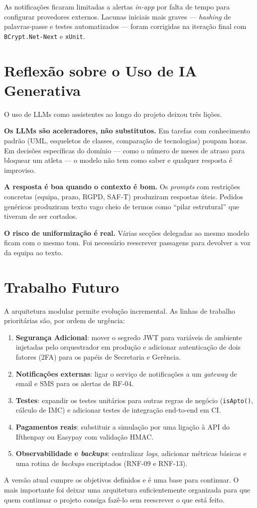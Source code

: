 As notificações ficaram limitadas a alertas \textit{in-app} por falta de tempo para configurar provedores externos. Lacunas iniciais mais graves --- \textit{hashing} de palavras-passe e testes automatizados --- foram corrigidas na iteração final com \texttt{BCrypt.Net-Next} e \texttt{xUnit}.

\section{Reflexão sobre o Uso de IA Generativa}

O uso de LLMs como assistentes ao longo do projeto deixou três lições.

\textbf{Os LLMs são aceleradores, não substitutos.} Em tarefas com conhecimento padrão (UML, esqueletos de classes, comparação de tecnologias) poupam horas. Em decisões específicas do domínio --- como o número de meses de atraso para bloquear um atleta --- o modelo não tem como saber e qualquer resposta é improviso.

\textbf{A resposta é boa quando o contexto é bom.} Os \textit{prompts} com restrições concretas (equipa, prazo, RGPD, SAF-T) produziram respostas úteis. Pedidos genéricos produziram texto vago cheio de termos como ``pilar estrutural'' que tiveram de ser cortados.

\textbf{O risco de uniformização é real.} Várias secções delegadas ao mesmo modelo ficam com o mesmo tom. Foi necessário reescrever passagens para devolver a voz da equipa ao texto.

\section{Trabalho Futuro}

A arquitetura modular permite evolução incremental. As linhas de trabalho prioritárias são, por ordem de urgência:

\begin{enumerate}
    \item \textbf{Segurança Adicional}: mover o segredo JWT para variáveis de ambiente injetadas pelo orquestrador em produção e adicionar autenticação de dois fatores (2FA) para os papéis de Secretaria e Gerência.
    \item \textbf{Notificações externas}: ligar o serviço de notificações a um \textit{gateway} de email e SMS para os alertas de RF-04.
    \item \textbf{Testes}: expandir os testes unitários para outras regras de negócio (\texttt{isApto()}, cálculo de IMC) e adicionar testes de integração end-to-end em CI.
    \item \textbf{Pagamentos reais}: substituir a simulação por uma ligação à API do Ifthenpay ou Easypay com validação HMAC.
    \item \textbf{Observabilidade e \textit{backups}}: centralizar \textit{logs}, adicionar métricas básicas e uma rotina de \textit{backups} encriptados (RNF-09 e RNF-13).
\end{enumerate}

A versão atual cumpre os objetivos definidos e é uma base para continuar. O mais importante foi deixar uma arquitetura suficientemente organizada para que quem continuar o projeto consiga fazê-lo sem reescrever o que está feito.
